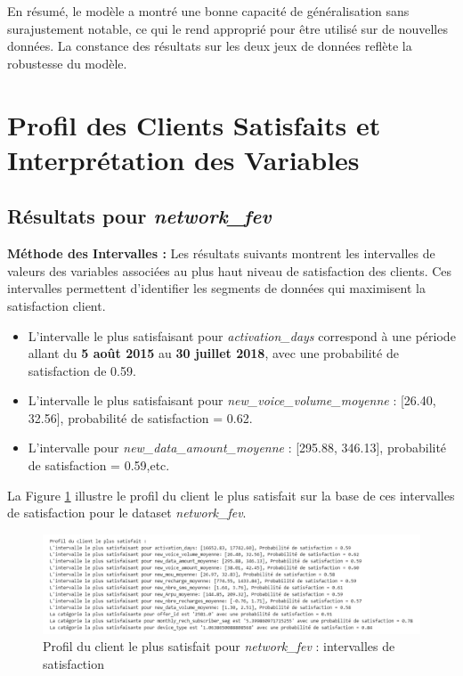 En résumé, le modèle a montré une bonne capacité de généralisation sans surajustement notable, ce qui le rend approprié pour être utilisé sur de nouvelles données. La constance des résultats sur les deux jeux de données reflète la robustesse du modèle.

\section{Profil des Clients Satisfaits et Interprétation des Variables}
\subsection{Résultats pour \textit{network\_fev}}

\textbf{Méthode des Intervalles :}
Les résultats suivants montrent les intervalles de valeurs des variables associées au plus haut niveau de satisfaction des clients. Ces intervalles permettent d'identifier les segments de données qui maximisent la satisfaction client.

\begin{itemize}
    \item L'intervalle le plus satisfaisant pour \textit{activation\_days} correspond à une période allant du \textbf{5 août 2015} au \textbf{30 juillet 2018}, avec une probabilité de satisfaction de 0.59.
    \item L'intervalle le plus satisfaisant pour \textit{new\_voice\_volume\_moyenne} : [26.40, 32.56], probabilité de satisfaction = 0.62.
    \item L'intervalle pour \textit{new\_data\_amount\_moyenne} : [295.88, 346.13], probabilité de satisfaction = 0.59,etc.
\end{itemize}

La Figure \ref{fig:profil_satisfaction} illustre le profil du client le plus satisfait sur la base de ces intervalles de satisfaction pour le dataset \textit{network\_fev}.

\begin{figure}[H]
    \centering
    \includegraphics[width=0.9\linewidth]{capture_modele_32.png}
    \caption{Profil du client le plus satisfait pour \textit{network\_fev} : intervalles de satisfaction}
    \label{fig:profil_satisfaction}
\end{figure}

